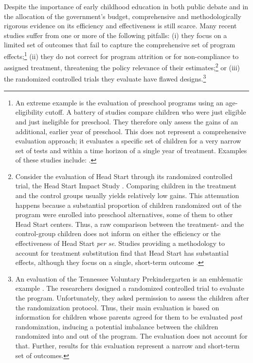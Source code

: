 \noindent Despite the importance of early childhood education in both public debate and in the allocation of the government's budget, comprehensive and methodologically rigorous evidence on its efficiency and effectiveness  is still scarce. Many recent studies suffer from one or more of the following pitfalls: (i) they focus on a limited set of outcomes that fail to capture the comprehensive set of program effects;\footnote{An extreme example is the evaluation of preschool programs using an age-eligibility cutoff. A battery of studies compare children who were just eligible and just ineligible for preschool. They therefore only assess the gains of an additional, earlier year of preschool. This does not represent a comprehensive evaluation approach; it evaluates a specific set of children for a very narrow set of tests and within a time horizon of a single year of treatment. Examples of these studies include: \citet{Gormley_Gayer_2005_JHR,Gormley_Gayer_etal_2005_DP,Weiland_2013_CD_Impacts-of-Pre-K}.} (ii) they do not correct for program attrition or for non-compliance to assigned treatment, threatening the policy relevance of their estimates;\footnote{Consider the evaluation of Head Start through its randomized controlled trial, the Head Start Impact Study \citep{Puma_Bell_etal_2010_HeadStartImpact}. Comparing children in the treatment and the control groups usually yields relatively low gains. This attenuation happens because a substantial proportion of children randomized out of the program were enrolled into preschool alternatives, some of them to other Head Start centers. Thus, a raw comparison between the treatment- and the control-group children does not inform on either the efficiency or the effectiveness of Head Start \emph{per se}. Studies providing a methodology to account for treatment substitution find that Head Start has substantial effects, although they focus on a single, short-term outcome \citep{Kline-Walters_2015_NBER-Evaluating,Feller_Grindal_etal_2016_ComparedtoWhat}.} or (iii) the randomized controlled trials they evaluate have flawed designs.\footnote{An evaluation of the Tennessee Voluntary Prekindergarten is an emblematic example \citep{Lipsey_et_al_2013_Tennessee_Kindergrtn_PRI,Lipsey_et_al_2015_Randomized_Control_Trial_PRI}. The researchers designed a randomized controlled trial to evaluate the program. Unfortunately, they asked permission to assess the children after the randomization protocol. Thus, their main evaluation is based on information for children whose parents agreed for them to be evaluated \textit{post} randomization, inducing a potential imbalance between the children randomized into and out of the program. The evaluation does not account for that. Further, results for this evaluation represent a narrow and short-term set of outcomes.}\\ 

